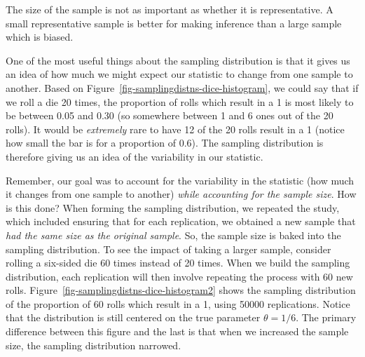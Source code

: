 \documentclass[
  letterpaper,
  DIV=11,
  numbers=noendperiod]{scrreprt}
\theoremstyle{plain}
\theoremstyle{definition}
\theoremstyle{definition}
\theoremstyle{remark}
\begin{document}
\begin{tcolorbox}[enhanced jigsaw, breakable, titlerule=0mm, colframe=quarto-callout-tip-color-frame, bottomtitle=1mm, opacityback=0, rightrule=.15mm, toptitle=1mm, arc=.35mm, bottomrule=.15mm, left=2mm, title=\textcolor{quarto-callout-tip-color}{\faLightbulb}\hspace{0.5em}{Big Idea}, leftrule=.75mm, coltitle=black, toprule=.15mm, colbacktitle=quarto-callout-tip-color!10!white, colback=white, opacitybacktitle=0.6]

The size of the sample is not as important as whether it is
representative. A small representative sample is better for making
inference than a large sample which is biased.

\end{tcolorbox}

One of the most useful things about the sampling distribution is that it
gives us an idea of how much we might expect our statistic to change
from one sample to another. Based on
Figure~\ref{fig-samplingdistns-dice-histogram}, we could say that if we
roll a die 20 times, the proportion of rolls which result in a 1 is most
likely to be between 0.05 and 0.30 (so somewhere between 1 and 6 ones
out of the 20 rolls). It would be \emph{extremely} rare to have 12 of
the 20 rolls result in a 1 (notice how small the bar is for a proportion
of 0.6). The sampling distribution is therefore giving us an idea of the
variability in our statistic.

Remember, our goal was to account for the variability in the statistic
(how much it changes from one sample to another) \emph{while accounting
for the sample size}. How is this done? When forming the sampling
distribution, we repeated the study, which included ensuring that for
each replication, we obtained a new sample that \emph{had the same size
as the original sample}. So, the sample size is baked into the sampling
distribution. To see the impact of taking a larger sample, consider
rolling a six-sided die 60 times instead of 20 times. When we build the
sampling distribution, each replication will then involve repeating the
process with 60 new rolls.
Figure~\ref{fig-samplingdistns-dice-histogram2} shows the sampling
distribution of the proportion of 60 rolls which result in a 1, using
50000 replications. Notice that the distribution is still centered on
the true parameter \(\theta = 1/6\). The primary difference between this
figure and the last is that when we increased the sample size, the
sampling distribution narrowed.
\end{document}
